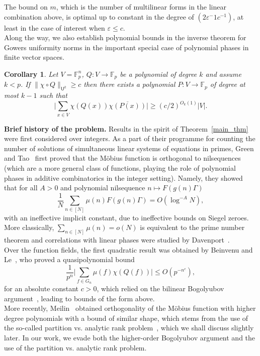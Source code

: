 \documentclass[a4paper,11pt]{article}
\newtheorem{corollary}[theorem]{Corollary}
\theoremstyle{definition}
\begin{document}
The bound on $m$, which is the number of multilinear forms in the linear combination above, is optimal up to constant in the degree of $(2\varepsilon{^-1}c^{-1})$, at least in the case of interest when $\varepsilon \leq c$.\\

Along the way, we also establish polynomial bounds in the inverse theorem for Gowers uniformity norms in the important special case of polynomial phases in finite vector spaces.

\begin{corollary}
    Let $V = \mathbb{F}_p^n$, $Q : V \to \mathbb{F}_p$ be a polynomial of degree $k$ and assume $k < p$. If $\|\chi \circ Q\|_{\mathsf{U}^k} \geq c$ then there exists a polynomial $P : V \to \mathbb{F}_p$ of degree at most $k-1$ such that
    \[\Big|\sum_{x \in V} \chi(Q(x))\overline{\chi(P(x))}\Big| \geq (c/2)^{O_k(1)} |V|.\]
\end{corollary}

\vspace{\baselineskip}


\noindent\textbf{Brief history of the problem.} Results in the spirit of Theorem~\ref{main_thm} were first considered over integers. As a part of their programme for counting the number of solutions of simultaneous linear systems of equations in primes, Green and Tao~\cite{GreenTaoMob1, GreenTaoMob2} first proved that the M\"obius function is orthogonal to nilsequences (which are a more general class of functions, playing the role of polynomial phases in additive combinatorics in the integer setting). Namely, they showed that for all $A > 0$ and polynomial nilsequence $n \mapsto F(g(n)\Gamma) $
\[\frac{1}{N}\sum_{n \in [N]}\mu(n)F(g(n)\Gamma) = O(\log^{-A} N),\]
with an ineffective implicit constant, due to ineffective bounds on Siegel zeroes. More classically, $\sum_{n \in [N]} \mu(n)= o(N)$ is equivalent to the prime number theorem and correlations with linear phases were studied by Davenport~\cite{Davenport}.\\
 
Over the function fields, the first quadratic result was obtained by Beinvenu and Le~\cite{BL}, who proved a quasipolynomial bound
\[\frac{1}{p^n}\Big|\sum_{f \in G_n} \mu(f)\chi(Q(f))\Big| \leq  O(p^{-n^c}),\]
for an absolute constant $c > 0$, which relied on the bilinear Bogolyubov argument~\cite{BienvenuLeBog, BilinearBog, HosseiniLovett}, leading to bounds of the form above.\\
\indent More recently, Meilin~\cite{Meilin} obtained orthogonality of the M\"obius function with higher degree polynomials with a bound of similar shape, which stems from the use of the so-called partition vs. analytic rank problem~\cite{BhowLov, GreenTaoPolys, Janzer2, LukaPrank, MoshZhuRank}, which we shall discuss slightly later. In our work, we evade both the higher-order Bogolyubov argument and the use of the partition vs. analytic rank problem.\\
\end{document}
